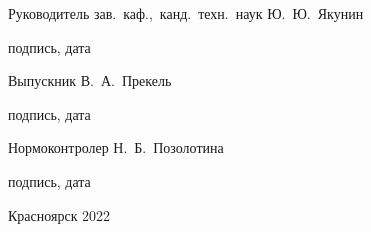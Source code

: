 \begin{spacing}{1}
    Руководитель
    \hfill
    \uline{\hspace{10ex}}
    \hspace{3.5ex}
    {зав.~каф.,~канд.~техн.~наук}
    \hspace{2ex}
    {Ю.~Ю.~Якунин}
    \par
    \vspace{-4pt}
    \par
    \hfill
    {\footnotesize подпись, дата}
    \hspace{46.1ex}

    Выпускник
    \hfill
    \uline{\hspace{10ex}}
    \hspace{31.9ex}
    {В.~А.~Прекель}
    \par
    \vspace{-4pt}
    \par
    \hfill
    {\footnotesize подпись, дата}
    \hspace{46.1ex}

    Нормоконтролер
    \hfill
    \uline{\hspace{10ex}}
    \hspace{28.9ex}
    {Н.~Б.~Позолотина}
    \par
    \vspace{-4pt}
    \par
    \hfill
    {\footnotesize подпись, дата}
    \hspace{46.1ex}
    \par

    \vfill

    \centerline{Красноярск 2022}

\end{spacing}

\thispagestyle{empty}

\clearpage
